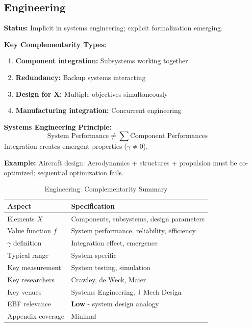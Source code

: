 \subsection{Engineering}
\label{sec:eng}

\begin{tcolorbox}[colback=gray!5!white,colframe=gray!75!black,title=\textbf{Engineering: System Integration and Component Synergies}]

\textbf{Status:} Implicit in systems engineering; explicit formalization emerging.

\textbf{Key Complementarity Types:}
\begin{enumerate}[noitemsep]
    \item \textbf{Component integration:} Subsystems working together
    \item \textbf{Redundancy:} Backup systems interacting
    \item \textbf{Design for X:} Multiple objectives simultaneously
    \item \textbf{Manufacturing integration:} Concurrent engineering
\end{enumerate}

\textbf{Systems Engineering Principle:}
\begin{equation}
\text{System Performance} \neq \sum \text{Component Performances}
\end{equation}
Integration creates emergent properties ($\gamma \neq 0$).

\textbf{Example:}
Aircraft design: Aerodynamics + structures + propulsion must be co-optimized; sequential optimization fails.

\end{tcolorbox}

\begin{table}[h]
\centering
\caption{Engineering: Complementarity Summary}
\label{tab:eng-summary}
\renewcommand{\arraystretch}{1.3}
\small
\begin{tabular}{@{}ll@{}}
\toprule
\textbf{Aspect} & \textbf{Specification} \\
\midrule
Elements $X$ & Components, subsystems, design parameters \\
Value function $f$ & System performance, reliability, efficiency \\
$\gamma$ definition & Integration effect, emergence \\
Typical range & System-specific \\
Key measurement & System testing, simulation \\
Key researchers & Crawley, de Weck, Maier \\
Key venues & Systems Engineering, J Mech Design \\
EBF relevance & \textbf{Low} - system design analogy \\
Appendix coverage & Minimal \\
\bottomrule
\end{tabular}
\end{table}

